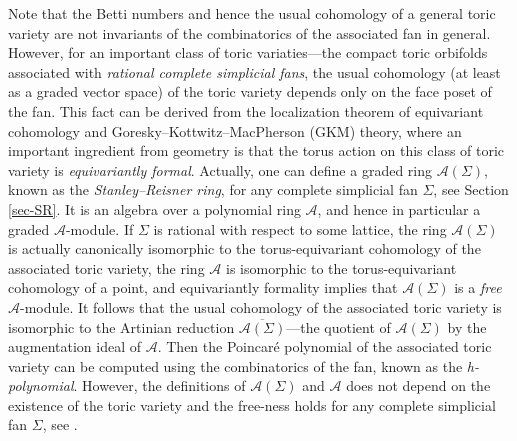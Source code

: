 \documentclass{amsart}
\theoremstyle{definition}
\theoremstyle{remark}
\numberwithin{equation}{section}
\begin{document}
Note that the Betti numbers and hence the usual cohomology of a general toric variety are not invariants of the combinatorics of the associated fan in general\cite{mcconnell1989rational}. However, for an important class of toric variaties---the compact toric orbifolds associated with \emph{rational complete simplicial fans}, the usual cohomology (at least as a graded vector space) of the toric variety depends only on the face poset of the fan\cite[Theorem 12.4.1 and Corollary 12.4.8]{cox2024toric}. This fact can be derived from the localization theorem of equivariant cohomology and Goresky--Kottwitz--MacPherson (GKM) theory\cite{goresky1998equivariant}, where an important ingredient from geometry is that the torus action on this class of toric variety is \emph{equivariantly formal}. Actually, one can define a graded ring $\mathcal{A}(\Sigma)$, known as the \emph{Stanley--Reisner ring}, for any complete simplicial fan $\Sigma$, see Section \ref{sec-SR}. It is an algebra over a polynomial ring $\mathcal{A}$, and hence in particular
a graded $\mathcal{A}$-module. If $\Sigma$ is rational with respect to some lattice, the ring $\mathcal{A}(\Sigma)$ is actually canonically isomorphic to the torus-equivariant cohomology of the associated toric variety, the ring $\mathcal{A}$ is isomorphic to the torus-equivariant cohomology of a point, and equivariantly formality implies that $\mathcal{A}(\Sigma)$ is a \emph{free} $\mathcal{A}$-module. It follows that the usual cohomology of the associated toric variety is isomorphic to the Artinian reduction $\overline{\mathcal{A}(\Sigma)}$---the quotient of $\mathcal{A}(\Sigma)$ by the augmentation ideal of $\mathcal{A}$. Then the Poincar\'e polynomial of the associated toric variety can be computed using the combinatorics of the fan, known as the \emph{h-polynomial}. However, the definitions of $\mathcal{A}(\Sigma)$ and $\mathcal{A}$ does not depend on the existence of the toric variety and the free-ness holds for any complete simplicial fan $\Sigma$, see \cite{stembridge1994some}.
\end{document}
